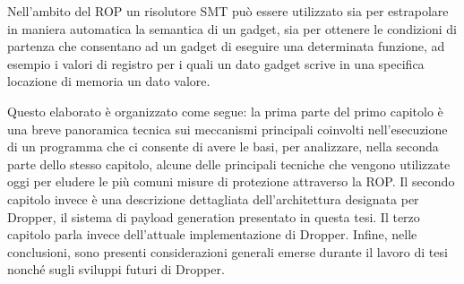 Nell'ambito del ROP un risolutore SMT pu\`{o} essere utilizzato sia per
estrapolare in maniera automatica la semantica di un gadget, sia per
ottenere le condizioni di partenza che consentano ad un gadget di
eseguire una determinata funzione, ad esempio i valori di registro per
i quali un dato gadget scrive in una specifica locazione di memoria un
dato valore.

Questo elaborato \`{e} organizzato come segue: la prima parte del primo
capitolo \`{e} una breve panoramica tecnica sui meccanismi principali
coinvolti nell'esecuzione di un programma che ci consente di avere le
basi, per analizzare, nella seconda parte dello stesso capitolo, alcune
delle principali tecniche che vengono utilizzate oggi per eludere le
pi\`{u} comuni misure di protezione attraverso la ROP. Il secondo capitolo
invece \`{e} una descrizione dettagliata dell'architettura designata per
Dropper, il sistema di payload generation presentato in questa tesi. 
Il terzo capitolo parla invece dell'attuale
implementazione di Dropper. Infine, nelle conclusioni, sono presenti considerazioni
generali emerse durante il lavoro di tesi nonch\'{e} sugli sviluppi futuri
di Dropper.


